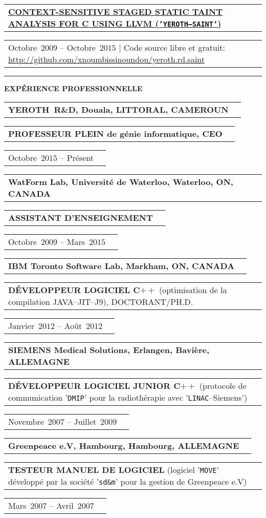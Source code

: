 \documentclass[9pt,a4paper]{article} %
\makeatletter
\newcommand{\headerrow}[2]
{\begin{tabular*}{\linewidth}{l@{\extracolsep{\fill}}r}
	#1 &
	#2 \\
\end{tabular*}}
\newcommand{\headerrowONE}[1]{\headerrow{#1}{}}
\newcommand{\cplusplus}{C$++$\xspace}
\newcommand{\cvitemdate}[2]{#1~$#2$\xspace}
\newcommand{\cvitempositionheld}[1]{\textbf{#1}\xspace}
\makeatother
\begin{document}
\vspace{0.3em}

\headerrowONE{\href{http://archive.org/details/saint_201507}{\textbf{CONTEXT-SENSITIVE STAGED STATIC TAINT ANALYSIS FOR C USING LLVM (\texttt{'YEROTH--SAINT'})}}}
\headerrowONE{\cvitemdate{Octobre}{2009} -- \cvitemdate{Octobre}{2015} | Code source libre et gratuit: \url{http://github.com/xnoumbissinoundou/yeroth.rd.saint}}
	
\vspace{1em}


\hrule
\begin{center}
{\large \textbf{EXPÉRIENCE PROFESSIONNELLE}}
\end{center}

\vspace{0.5em}

\headerrowONE{\textbf{YEROTH~R\&D, Douala, LITTORAL, CAMEROUN}}
\headerrowONE{\cvitempositionheld{PROFESSEUR PLEIN de génie informatique, CEO}}
\headerrowONE{\cvitemdate{Octobre}{2015} -- Présent}	

\vspace{0.3em}

\headerrowONE{\textbf{WatForm Lab, Université de Waterloo, Waterloo, ON, CANADA}}	
\headerrowONE{\cvitempositionheld{ASSISTANT D'ENSEIGNEMENT}}
\headerrowONE{\cvitemdate{Octobre}{2009} -- \cvitemdate{Mars}{2015}}
	
\vspace{0.3em}

\headerrowONE{\textbf{IBM Toronto Software Lab, Markham, ON, CANADA}}	
\headerrowONE{\cvitempositionheld{DÉVELOPPEUR LOGICIEL \cplusplus} (optimisation de la compilation JAVA--JIT--J$9$), DOCTORANT/PH.D.}
\headerrowONE{\cvitemdate{Janvier}{2012} -- \cvitemdate{Août}{2012}}	

\vspace{0.3em}

\headerrowONE{\textbf{SIEMENS Medical Solutions, Erlangen, Bavière, ALLEMAGNE}}	
\headerrowONE{\cvitempositionheld{DÉVELOPPEUR LOGICIEL JUNIOR \cplusplus} (protocole 
de communication '\texttt{DMIP}' pour la radiothérapie avec '\texttt{LINAC}--Siemens')}
\headerrowONE{\cvitemdate{Novembre}{2007} -- \cvitemdate{Juillet}{2009}}	
	
\vspace{0.3em}

\headerrowONE{\textbf{Greenpeace e.V, Hambourg, Hambourg, ALLEMAGNE}}	
\headerrowONE{\cvitempositionheld{TESTEUR MANUEL DE LOGICIEL} 
(logiciel '\texttt{MOVE}' développé par la société '\texttt{sd\&m}' pour la gestion de Greenpeace e.V)}
\headerrowONE{\cvitemdate{Mars}{2007} -- \cvitemdate{Avril}{2007}}	
\end{document}
